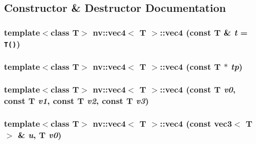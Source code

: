 \subsection{Constructor \& Destructor Documentation}
\hypertarget{classnv_1_1vec4_0470436181d9e8f169f71bba61e5f4ee}{
\subsubsection[{vec4}]{\setlength{\rightskip}{0pt plus 5cm}template$<$class T$>$ {\bf nv::vec4}$<$ T $>$::{\bf vec4} (const T \& {\em t} = {\tt T()})}}
\label{classnv_1_1vec4_0470436181d9e8f169f71bba61e5f4ee}


\hypertarget{classnv_1_1vec4_49189b4f132699a853a585e7abd3d4a4}{
\subsubsection[{vec4}]{\setlength{\rightskip}{0pt plus 5cm}template$<$class T$>$ {\bf nv::vec4}$<$ T $>$::{\bf vec4} (const T $\ast$ {\em tp})}}
\label{classnv_1_1vec4_49189b4f132699a853a585e7abd3d4a4}


\hypertarget{classnv_1_1vec4_2ba35eefe81119c372be34475d33a49c}{
\subsubsection[{vec4}]{\setlength{\rightskip}{0pt plus 5cm}template$<$class T$>$ {\bf nv::vec4}$<$ T $>$::{\bf vec4} (const T {\em v0}, \/  const T {\em v1}, \/  const T {\em v2}, \/  const T {\em v3})}}
\label{classnv_1_1vec4_2ba35eefe81119c372be34475d33a49c}


\hypertarget{classnv_1_1vec4_aa0de52ffe83b44710ded7a797f978f6}{
\subsubsection[{vec4}]{\setlength{\rightskip}{0pt plus 5cm}template$<$class T$>$ {\bf nv::vec4}$<$ T $>$::{\bf vec4} (const {\bf vec3}$<$ T $>$ \& {\em u}, \/  T {\em v0})}}
\label{classnv_1_1vec4_aa0de52ffe83b44710ded7a797f978f6}


